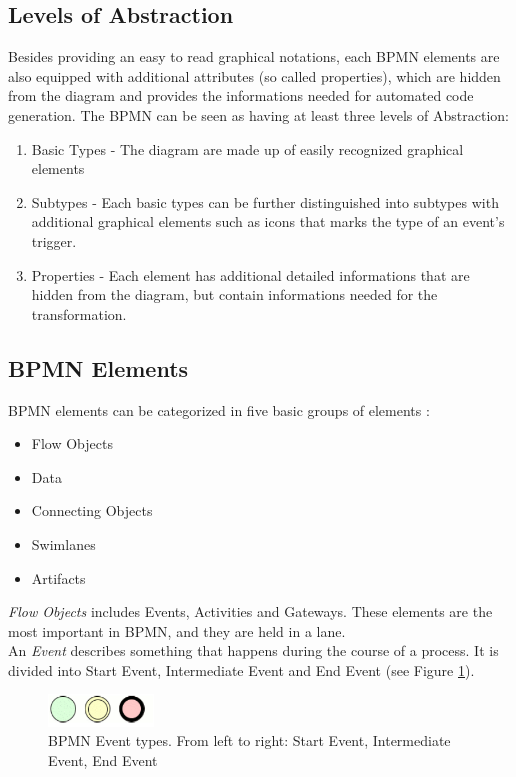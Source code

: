 \subsection{Levels of Abstraction}
Besides providing an easy to read graphical notations, each BPMN elements are also equipped with additional attributes (so called properties), which are hidden from the diagram and provides the informations needed for automated code generation. The BPMN can be seen as having at least three levels of Abstraction:
\begin{enumerate}
	\item Basic Types - The diagram are made up of easily recognized graphical elements
	\item Subtypes - Each basic types can be further distinguished into subtypes with additional graphical elements such as icons that marks the type of an event's trigger.
	\item Properties - Each element has additional detailed informations that are hidden from the diagram, but contain informations needed for the transformation.
\end{enumerate}


\subsection{BPMN Elements}
BPMN elements can be categorized in five basic groups of elements\cite{BPMN2} :
\begin{itemize}
	\item Flow Objects
	\item Data
	\item Connecting Objects
	\item Swimlanes
	\item Artifacts
\end{itemize}
\textit{Flow Objects} includes Events, Activities and Gateways. These elements are the most important in BPMN, and they are held in a lane.\\

An \textit{Event} describes something that happens during the course of a process. It is divided into Start Event, Intermediate Event and End Event (see Figure \ref{fig:events}).\\
\begin{figure}[h]
	\centering
	\includegraphics[width=0.25\textwidth]{images/events.png}
	\caption{BPMN Event types. From left to right: Start Event, Intermediate Event, End Event}
	\label{fig:events}
\end{figure}

